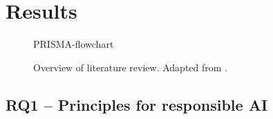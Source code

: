 \section{Results}
\label{sec:Results}
\begin{figure}[p]
    \centering
    {PRISMA-flowchart}
    \caption[Overview of literature review]{Overview of literature review. Adapted from \textcite{PRISMA_2022}.}
    \label{fig:PRISMA-flowchart}
\end{figure}





\subsection{RQ1 -- Principles for responsible AI}





